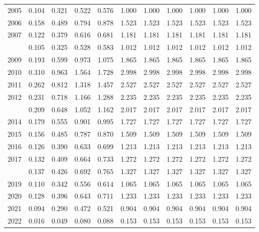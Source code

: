 \documentclass[
]{article}
\begin{document}
\begin{longtable}[t]{lrrrrrrrrrr}
2005 & 0.104 & 0.321 & 0.522 & 0.576 & 1.000 & 1.000 & 1.000 & 1.000 & 1.000 & 1.000\\
2006 & 0.158 & 0.489 & 0.794 & 0.878 & 1.523 & 1.523 & 1.523 & 1.523 & 1.523 & 1.523\\
2007 & 0.122 & 0.379 & 0.616 & 0.681 & 1.181 & 1.181 & 1.181 & 1.181 & 1.181 & 1.181\\
\addlinespace
2008 & 0.105 & 0.325 & 0.528 & 0.583 & 1.012 & 1.012 & 1.012 & 1.012 & 1.012 & 1.012\\
2009 & 0.193 & 0.599 & 0.973 & 1.075 & 1.865 & 1.865 & 1.865 & 1.865 & 1.865 & 1.865\\
2010 & 0.310 & 0.963 & 1.564 & 1.728 & 2.998 & 2.998 & 2.998 & 2.998 & 2.998 & 2.998\\
2011 & 0.262 & 0.812 & 1.318 & 1.457 & 2.527 & 2.527 & 2.527 & 2.527 & 2.527 & 2.527\\
2012 & 0.231 & 0.718 & 1.166 & 1.288 & 2.235 & 2.235 & 2.235 & 2.235 & 2.235 & 2.235\\
\addlinespace
2013 & 0.209 & 0.648 & 1.052 & 1.162 & 2.017 & 2.017 & 2.017 & 2.017 & 2.017 & 2.017\\
2014 & 0.179 & 0.555 & 0.901 & 0.995 & 1.727 & 1.727 & 1.727 & 1.727 & 1.727 & 1.727\\
2015 & 0.156 & 0.485 & 0.787 & 0.870 & 1.509 & 1.509 & 1.509 & 1.509 & 1.509 & 1.509\\
2016 & 0.126 & 0.390 & 0.633 & 0.699 & 1.213 & 1.213 & 1.213 & 1.213 & 1.213 & 1.213\\
2017 & 0.132 & 0.409 & 0.664 & 0.733 & 1.272 & 1.272 & 1.272 & 1.272 & 1.272 & 1.272\\
\addlinespace
2018 & 0.137 & 0.426 & 0.692 & 0.765 & 1.327 & 1.327 & 1.327 & 1.327 & 1.327 & 1.327\\
2019 & 0.110 & 0.342 & 0.556 & 0.614 & 1.065 & 1.065 & 1.065 & 1.065 & 1.065 & 1.065\\
2020 & 0.128 & 0.396 & 0.643 & 0.711 & 1.233 & 1.233 & 1.233 & 1.233 & 1.233 & 1.233\\
2021 & 0.094 & 0.290 & 0.472 & 0.521 & 0.904 & 0.904 & 0.904 & 0.904 & 0.904 & 0.904\\
2022 & 0.016 & 0.049 & 0.080 & 0.088 & 0.153 & 0.153 & 0.153 & 0.153 & 0.153 & 0.153\\*
\end{longtable}
\end{document}
